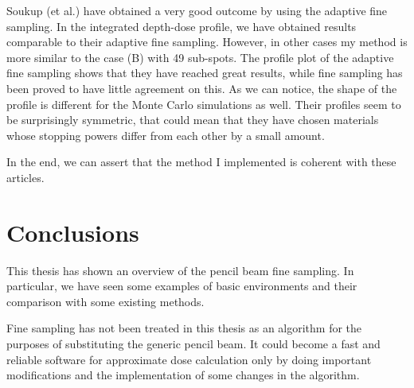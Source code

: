 \documentclass[12pt, a4paper, twoside]{book}
\begin{document}
Soukup (et al.) have obtained a very good outcome by using the adaptive fine sampling. In the integrated depth-dose profile, we have obtained results comparable to their adaptive fine sampling. However, in other cases my method is more similar to the case (B) with 49 sub-spots. The profile plot of the adaptive fine sampling shows that they have reached great results, while fine sampling has been proved to have little agreement on this. As we can notice, the shape of the profile is different for the Monte Carlo simulations as well. Their profiles seem to be surprisingly symmetric, that could mean that they have chosen materials whose stopping powers differ from each other by a small amount. 


In the end, we can assert that the method I implemented is coherent with these articles.


\chapter{Conclusions} %
This thesis has shown an overview of the pencil beam fine sampling. In particular, we have seen some examples of basic environments and their comparison with some existing methods. 

Fine sampling has not been treated in this thesis as an algorithm for the purposes of substituting the generic pencil beam. It could become a fast and reliable software for approximate dose calculation only by doing important modifications and the implementation of some changes in the algorithm.
\end{document}
